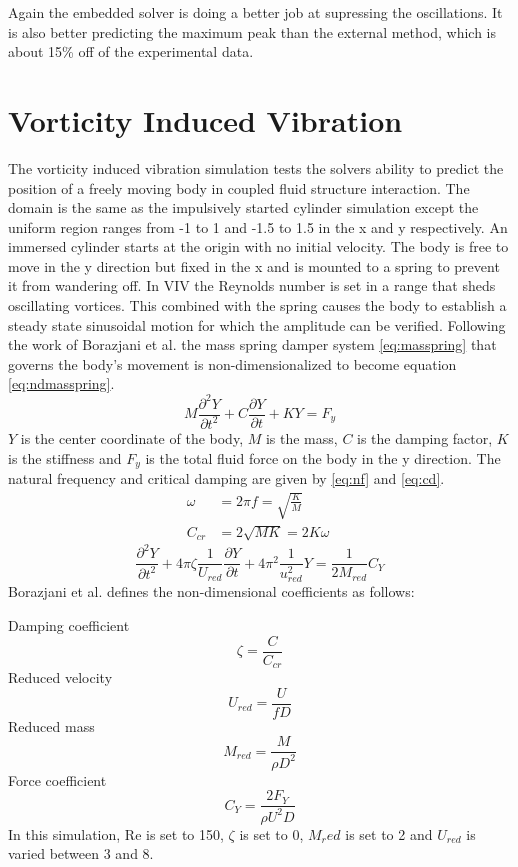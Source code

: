 \documentclass[onehalf,11pt]{beavtex}
\begin{document}
Again the embedded solver is doing a better job at supressing the oscillations. It is also better predicting the maximum peak than the external method, which is about 15\% off of the experimental data.

\section{Vorticity Induced Vibration}
The vorticity induced vibration simulation tests the solvers ability to predict the position of a freely moving body in coupled fluid structure interaction.
The domain is the same as the impulsively started cylinder simulation except the uniform region ranges from -1 to 1 and -1.5 to 1.5 in the x and y respectively.
An immersed cylinder starts at the origin with no initial velocity.
The body is free to move in the y direction but fixed in the x and is mounted to a spring to prevent it from wandering off.
In VIV the Reynolds number is set in a range that sheds oscillating vortices.
This combined with the spring causes the body to establish a steady state sinusoidal motion for which the amplitude can be verified.
Following the work of Borazjani et al. the mass spring damper system \eqref{eq:masspring} that governs the body's movement is non-dimensionalized to become equation \eqref{eq:ndmasspring}.
\begin{equation}
M\frac{\partial^2Y}{\partial t^2}+C\frac{\partial Y}{\partial t}+KY=F_y \label{eq:masspring}
\end{equation}
$Y$ is the center coordinate of the body, $M$ is the mass, $C$ is the damping factor, $K$ is the stiffness and $F_y$ is the total fluid force on the body in the y direction. 
The natural frequency and critical damping are given by \eqref{eq:nf} and \eqref{eq:cd}.
\begin{align}
\omega &=2\pi f =\sqrt{\frac{K}{M}}\label{eq:nf}\\
C_{cr}&=2\sqrt{MK}=2K\omega \; \label{eq:cd}
\end{align}
\begin{equation}
\frac{\partial^2 Y}{\partial t^2}+4\pi \zeta\frac{1}{U_{red}}\frac{\partial Y}{\partial t}+4\pi^2\frac{1}{u_{red}^2}Y=\frac{1}{2M_{red}}C_Y\label{eq:ndmasspring}
\end{equation}
Borazjani et al. defines the non-dimensional coefficients as follows:

Damping coefficient
\begin{equation}
\zeta=\frac{C}{C_{cr}}\label{eq:damping coefficient}
\end{equation}
Reduced velocity
\begin{equation}
U_{red}=\frac{U}{fD}\label{eq:reduced velocity}
\end{equation}
Reduced mass
\begin{equation}
M_{red}=\frac{M}{\rho D^2}\label{eq:reduced mass}
\end{equation}
Force coefficient
\begin{equation}
C_Y=\frac{2F_Y}{\rho U^2 D}\label{eq:force coefficient}
\end{equation}
In this simulation, Re is set to 150, $\zeta$ is set to 0, $M_red$ is set to 2 and $U_{red}$ is varied between 3 and 8.
\end{document}
